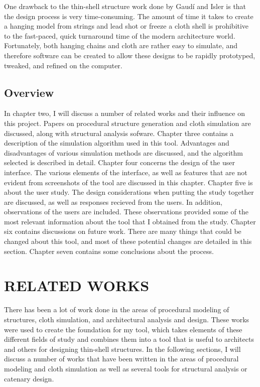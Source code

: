\documentclass{thesis}
\begin{document}
One drawback to the thin-shell structure work done by Gaud\'{i} and Isler is that the design process is very time-consuming.  The amount of time
it takes to create a hanging model from strings and lead shot or freeze a cloth shell is prohibitive to the fast-paced, quick turnaround time of
the modern architecture world.  Fortunately, both hanging chains and cloth are rather easy to simulate, and therefore software can be created to
allow these designs to be rapidly prototyped, tweaked, and refined on the computer.

\section{Overview}
In chapter two, I will discuss a number of related works and their influence on this project.  Papers on
procedural structure generation and cloth simulation are discussed, along with structural analysis sofware.
Chapter three contains a description of the simulation algorithm used in this tool.  Advantages and
disadvantages of various simulation methods are discussed, and the algorithm selected is described in detail.
Chapter four concerns the design of the user interface.  The various elements of the interface, as well as
features that are not evident from screenshots of the tool are discussed in this chapter.  Chapter five is
about the user study.  The design considerations when putting the study together are discussed, as well as
responses recieved from the users.  In addition, observations of the users are included.  These observations
provided some of the most relevant information about the tool that I obtained from the study.  Chapter six
contains discussions on future work.  There are many things that could be changed about this tool, and most
of these potential changes are detailed in this section.  Chapter seven contains some conclusions about the
process.

\clearpage
\chapter{RELATED WORKS}
There has been a lot of work done in the areas of procedural modeling of structures, cloth simulation, and
architectural analysis and design.  These works were used to create the foundation for my tool, which takes
elements of these different fields of study and combines them into a tool that is useful to architects and
others for designing thin-shell structures.  In the following sections, I will discuss a number of works
that have been written in the areas of procedural modeling and cloth simulation as well as several tools
for structural analysis or catenary design.
\end{document}

